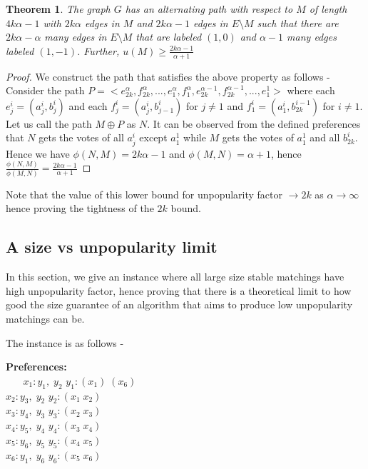 \documentclass[a4paper,10pt]{article}
\theoremstyle{plain} %
\newtheorem{theorem}{Theorem}[section] %
\theoremstyle{plain} %
\begin{document}
\begin{theorem}
    The graph $G$ has an alternating path with respect to $M$ of length $4k\alpha - 1$ with $2k\alpha$ edges in $M$ and $2k\alpha-1$ edges in $E \setminus M$ such that there are $2k\alpha -\alpha$ many edges in $E \setminus M$ that are labeled $(1, 0)$ and $\alpha - 1$ many edges labeled $(1, -1)$. Further, $u(M) \geq \frac{2k\alpha - 1}{\alpha + 1}$
\end{theorem}

\begin{proof}
    We construct the path that satisfies the above property as follows - 
    Consider the path $P = <e^\alpha_{2k}, f^\alpha_{2k}, ..., e^\alpha_1, f^\alpha_1, e^{\alpha-1}_{2k}, f^{\alpha-1}_{2k}, ..., e^1_{1}>$ where each $e^i_j = (a^i_j, b^i_j)$ and each $f^i_j = (a^i_j, b^i_{j-1})$ for $j \neq 1$ and $f^i_1 = (a^i_1, b^{i-1}_{2k})$ for $i \neq 1$. Let us call the path $M \oplus P$ as $N$. It can be observed from the defined preferences that $N$ gets the votes of all $a^i_j$ except $a^1_1$ while $M$ gets the votes of $a^1_1$ and all $b^i_{2k}$. Hence we have $\phi(N, M) = 2k\alpha - 1$ and $\phi(M, N) = \alpha + 1$, hence $\frac{\phi(N, M)}{\phi(M, N)} = \frac{2k\alpha - 1}{\alpha + 1}$
\end{proof}

Note that the value of this lower bound for unpopularity factor $\rightarrow 2k$ as $\alpha \rightarrow \infty$ hence proving the tightness of the $2k$ bound.

\subsection{A size vs unpopularity limit}
In this section, we give an instance where all large size stable matchings have high unpopularity factor, hence proving that there is a theoretical limit to how good the size guarantee of an algorithm that aims to produce low unpopularity matchings can be.

The instance is as follows - \\
\begin{center}
\textbf{Preferences:} \\
$\phantom{()}x_1: y_1, \; y_2$ \phantom{Invisible text} $y_1: (x_1) \; (x_6)$ \\
$x_2: y_3, \; y_2$ \phantom{Invisible text} $y_2: (x_1 \; x_2)$ \\
$x_3: y_4, \; y_3$ \phantom{Invisible text} $y_3: (x_2 \; x_3)$ \\
$x_4: y_5, \; y_4$ \phantom{Invisible text} $y_4: (x_3 \; x_4)$ \\
$x_5: y_6, \; y_5$ \phantom{Invisible text} $y_5: (x_4 \; x_5)$ \\
$x_6: y_1, \; y_6$ \phantom{Invisible text} $y_6: (x_5 \; x_6)$ \\
\end{center}
\end{document}
